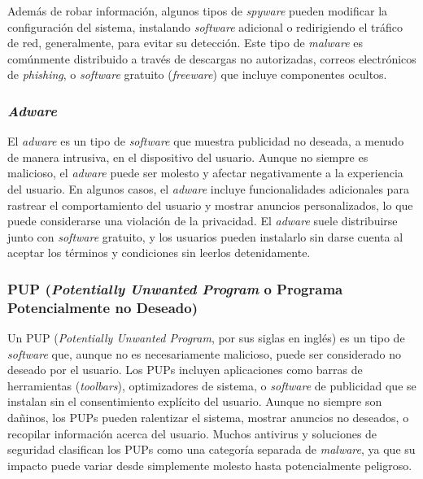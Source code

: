 Además de robar información, algunos tipos de \textit{spyware} pueden modificar la configuración del sistema, instalando \textit{software} adicional o redirigiendo el tráfico de red, generalmente, para evitar su detección. Este tipo de \textit{malware} es comúnmente distribuido a través de descargas no autorizadas, correos electrónicos de \textit{phishing}, o \textit{software} gratuito (\textit{freeware}) que incluye componentes ocultos.

\subsubsection{\textit{Adware}}
El \textit{adware} es un tipo de \textit{software} que muestra publicidad no deseada, a menudo de manera intrusiva, en el dispositivo del usuario. Aunque no siempre es malicioso, el \textit{adware} puede ser molesto y afectar negativamente a la experiencia del usuario. En algunos casos, el \textit{adware} incluye funcionalidades adicionales para rastrear el comportamiento del usuario y mostrar anuncios personalizados, lo que puede considerarse una violación de la privacidad. El \textit{adware} suele distribuirse junto con \textit{software} gratuito, y los usuarios pueden instalarlo sin darse cuenta al aceptar los términos y condiciones sin leerlos detenidamente.

\subsubsection{PUP (\textit{Potentially Unwanted Program} o Programa Potencialmente no Deseado)}
Un PUP (\textit{Potentially Unwanted Program}, por sus siglas en inglés) es un tipo de \textit{software} que, aunque no es necesariamente malicioso, puede ser considerado no deseado por el usuario. Los PUPs incluyen aplicaciones como barras de herramientas (\textit{toolbars}), optimizadores de sistema, o \textit{software} de publicidad que se instalan sin el consentimiento explícito del usuario. Aunque no siempre son dañinos, los PUPs pueden ralentizar el sistema, mostrar anuncios no deseados, o recopilar información acerca del usuario. Muchos antivirus y soluciones de seguridad clasifican los PUPs como una categoría separada de \textit{malware}, ya que su impacto puede variar desde simplemente molesto hasta potencialmente peligroso.

